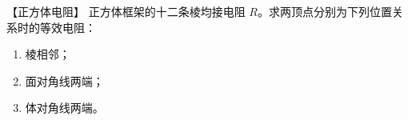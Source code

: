 \newcommand{\sierpinskiDiagram}{%
\begin{center}
\begin{tikzpicture}[scale=0.78]
  \begin{scope}[xshift=-3.4cm]
    \fill[PaleBlue] (-1.7,-1.1)--(1.7,-1.1)--(0,1.84)--cycle;
    \node[below] at (0,-1.45) {第 0 阶};
  \end{scope}
  \begin{scope}
    \fill[PaleBlue] (-1.7,-1.1)--(0,-1.1)--(-0.85,0.37)--cycle;
    \fill[PaleBlue] (0,-1.1)--(1.7,-1.1)--(0.85,0.37)--cycle;
    \fill[PaleBlue] (-0.85,0.37)--(0.85,0.37)--(0,1.84)--cycle;
    \draw[curve] (-1.7,-1.1)--(1.7,-1.1)--(0,1.84)--cycle;
    \node[below] at (0,-1.45) {第 1 阶};
  \end{scope}
  \begin{scope}[xshift=3.4cm]
    \foreach \sx/\sy in {-1.275/-0.735,0/-0.735,-0.6375/0.3675}{
      \fill[PaleBlue] (\sx-0.425,\sy-0.3675)--(\sx+0.425,\sy-0.3675)--(\sx,\sy+0.3675)--cycle;
    }
    \foreach \sx/\sy in {-0.425/-0.735,0.85/-0.735,0.425/0.3675}{
      \fill[PaleBlue] (\sx-0.425,\sy-0.3675)--(\sx+0.425,\sy-0.3675)--(\sx,\sy+0.3675)--cycle;
    }
    \fill[PaleBlue] (-0.425,0.735)--(0.425,0.735)--(0,1.47)--cycle;
    \draw[curve] (-1.7,-1.1)--(1.7,-1.1)--(0,1.84)--cycle;
    \node[below] at (0,-1.45) {第 2 阶};
  \end{scope}
\end{tikzpicture}

\figcap{谢尔宾斯基镂垫的前几阶构造}\label{appE:fig:s23-legacy-13}
\end{center}}


\begin{origexamplebox}{【正方体电阻】}\label{appE:ex:s23-34-6}
正方体框架的十二条棱均接电阻 $R$。求两顶点分别为下列位置关系时的等效电阻：
\begin{enumerate}[label=(\arabic*),leftmargin=2.2em]
  \item 棱相邻；
  \item 面对角线两端；
  \item 体对角线两端。
\end{enumerate}

\end{origexamplebox}

